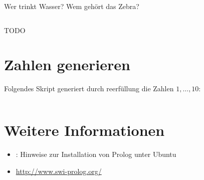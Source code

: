 Wer trinkt Wasser? Wem gehört das Zebra?

\inputminted[linenos, numbersep=5pt, tabsize=4, frame=lines, label=zebraraetsel.pro]{prolog}{scripts/prolog/zebraraetsel.pro}

TODO

\section{Zahlen generieren}
Folgendes Skript generiert durch reerfüllung die Zahlen $1, \dots, 10$:

\inputminted[numbersep=5pt, tabsize=4]{prolog}{scripts/prolog/zahlen-bis-10.pl}

\section{Weitere Informationen}
\begin{itemize}
    \item \href{http://wiki.ubuntuusers.de/Prolog}{}: Hinweise zur Installation von Prolog unter Ubuntu
    \item \url{http://www.swi-prolog.org/}
\end{itemize}
